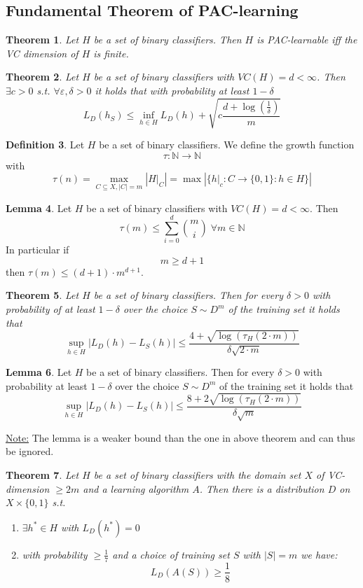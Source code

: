 \documentclass[a4paper, 12pt]{article}
\theoremstyle{plain}
\newtheorem{theorem}{Theorem}[subsection] %
\theoremstyle{definition}
\newtheorem{definition}[theorem]{Definition} %
\theoremstyle{lemma}
\newtheorem{lemma}[theorem]{Lemma}
\theoremstyle{remark}
\theoremstyle{example}
\begin{document}
	\subsection{Fundamental Theorem of PAC-learning}
	\begin{theorem}
		Let $H$ be a set of binary classifiers. Then $H$ is PAC-learnable iff the VC dimension of $H$ is finite.
	\end{theorem}
	\begin{theorem}
		Let $H$ be a set of binary classifiers with $VC(H) = d < \infty$. Then $\exists c > 0$ s.t. $\forall \varepsilon, \delta > 0$ it holds that with probability at least $1-\delta$ \[L_D(h_S) \leq \inf_{h \in H} L_D(h) + \sqrt{c\frac{d+\log(\frac{1}{\delta})}{m}}\]
	\end{theorem}
	\begin{definition}
		Let $H$ be a set of binary classifiers. We define the growth function \[\tau: \mathbb{N} \to \mathbb{N}\] with \[\tau(n) = \max\limits_{C\subseteq X, \left|C\right| = m} \left|H|_C\right| = \max\left|\{h|_c: C \to \{0,1\}: h \in H\}\right|\]
	\end{definition}
	\begin{lemma}
		Let $H$ be a set of binary classifiers with $VC(H) = d < \infty$. Then \[\tau(m) \leq \sum_{i=0}^d \binom{m}{i} \; \forall m \in \mathbb{N}\] In particular if \[m \geq d+1\] then $\tau(m) \leq (d+1)\cdot m^{d+1}$.
	\end{lemma}
	\begin{theorem}
		Let $H$ be a set of binary classifiers. Then for every $\delta >0$ with probability of at least $1-\delta$ over the choice $S\sim D^m$ of the training set it holds that \[\sup_{h \in H} \left|L_D(h) - L_S(h)\right| \leq \frac{4+\sqrt{\log(\tau_H(2\cdot m))}}{\delta\sqrt{2\cdot m}}\] 
	\end{theorem}
	\begin{lemma}
		Let $H$ be a set of binary classifiers. Then for every $\delta > 0$ with probability at least $1-\delta$ over the choice $S\sim D^m$ of the training set it holds that \[\sup_{h \in H} \left|L_D(h) - L_S(h)\right| \leq \frac{8+2\sqrt{\log(\tau_H(2\cdot m))}}{\delta \sqrt{m}}\]
	\end{lemma}
	\underline{Note:} The lemma is a weaker bound than the one in above theorem and can thus be ignored.
	\begin{theorem}
		Let $H$ be a set of binary classifiers with the domain set $X$ of VC-dimension $\geq2m$ and a learning algorithm $A$. Then there is a distribution $D$ on $X\times \{0,1\}$ s.t. \begin{enumerate}
			\item $\exists h^* \in H$ with $L_D(h^*) = 0$
			\item with probability $\geq \frac{1}{7}$ and a choice of training set $S$ with $\left|S\right| = m$ we have: \[L_D(A(S)) \geq \frac{1}{8}\]
		\end{enumerate}
	\end{theorem}
\end{document}
